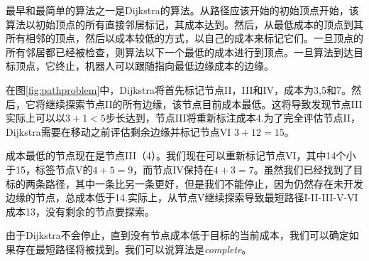 


最早和最简单的算法之一是Dijkstra的算法\cite{dijkstra1959note}。从路径应该开始的初始顶点开始，该算法以初始顶点的所有直接邻居标记，其成本达到。然后，从最低成本的顶点到其所有相邻的顶点，然后以成本较低的方式，以自己的成本来标记它们。一旦顶点的所有邻居都已经被检查，则算法以下一个最低的成本进行到顶点。一旦算法到达目标顶点，它终止，机器人可以跟随指向最低边缘成本的边缘。

在图\ref{fig:pathproblem}中，Dijkstra将首先标记节点II，III和IV，成本为3,5和7。然后，它将继续探索节点II的所有边缘，该节点目前成本最低。这将导致发现节点III实际上可以以$ 3 + 1 <5 $步长达到，节点III将重新标注成本4.为了完全评估节点II，Dijkstra需要在移动之前评估剩余边缘并标记节点VI $ 3 + 12 = 15 $。

成本最低的节点现在是节点III（4）。我们现在可以重新标记节点VI，其中14个小于15，标签节点V的$ 4 + 5 = 9 $，而节点IV保持在$ 4 + 3 = 7 $。虽然我们已经找到了目标的两条路径，其中一条比另一条更好，但是我们不能停止，因为仍然存在未开发边缘的节点，总成本低于14.实际上，从节点V继续探索导致最短路径I-II-III-V-VI成本13，没有剩余的节点要探索。

由于Dijkstra不会停止，直到没有节点成本低于目标的当前成本，我们可以确定如果存在最短路径将被找到。我们可以说算法是\emph {complete}。

